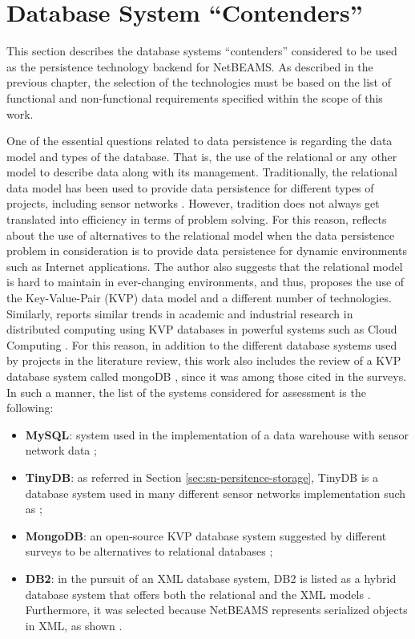 \section{Database System ``Contenders''}

This section describes the database systems ``contenders'' considered to be used
as the persistence technology backend for NetBEAMS. As described in the
previous chapter, the selection of the technologies must be based on the list
of functional and non-functional requirements specified within the scope of
this work.

One of the essential questions related to data persistence is regarding the
data model and types of the database. That is, the use of the relational or
any other model to describe data along with its management. Traditionally, the
relational data model has been used to provide data persistence for different
types of projects, including sensor networks \cite{sn-dataware-house,
db-xml-enabled, sn-db-tinydb}. However, tradition does not always get
translated into efficiency in terms of problem solving. For this reason,
\cite{db-is-rdbs-dommed} reflects about the use of alternatives to the
relational model when the data persistence problem in consideration is to
provide data persistence for dynamic environments such as Internet applications.
The author also suggests that the relational model is hard to maintain in
ever-changing environments, and thus, proposes the use of the Key-Value-Pair
(KVP) data model and a different number of technologies. Similarly,
\cite{cloud-comp-survey} reports similar trends in academic and industrial
research in distributed computing using KVP databases in powerful systems
such as Cloud Computing \cite{cloud-comp-architectures}. For this reason, in
addition to the different database systems used by projects in the
literature review, this work also includes the review of a KVP database system
called mongoDB \cite{mongodb}, since it was among those cited in the surveys.
In such a manner, the list of the systems considered for assessment is the
following:

\begin{itemize}
  \item \textbf{MySQL}\cite{mysql}: system used in the implementation of a
  data warehouse with sensor network data \cite{sn-dataware-house};
  \item \textbf{TinyDB}\cite{tinydb}: as referred in Section 
  \ref{sec:sn-persitence-storage}, TinyDB is a database system used in many
  different sensor networks implementation such as \cite{sn-db-tinydb};
  \item \textbf{MongoDB}\cite{mongodb}: an open-source KVP database
  system suggested by different surveys to be alternatives to relational
  databases \cite{db-is-rdbs-dommed, cloud-comp-architectures};
  \item \textbf{DB2}\cite{db2}: in the pursuit of an XML database system, DB2
  is listed as a hybrid database system that offers both the relational and the
  XML models \cite{db-xml-enabled}. Furthermore, it was selected because
  NetBEAMS represents serialized objects in XML, as shown
  \cite{netbeams-dsp-architecture}.
\end{itemize}

